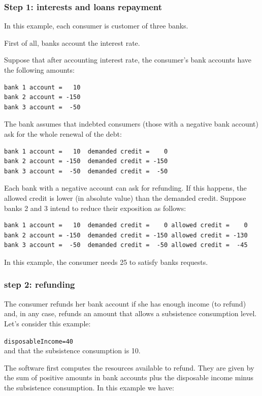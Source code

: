 \documentclass{book}
\begin{document}
\subsubsection*{Step 1: interests and loans repayment}

In this example, each consumer is customer of three banks.

First of all, banks account the interest rate.

Suppose that after accounting interest rate, the consumer's bank accounts have the following amounts:
\begin{verbatim}
bank 1 account =   10
bank 2 account = -150
bank 3 account =  -50
\end{verbatim}

The bank assumes that indebted consumers (those with a negative bank account) ask for the whole renewal of the debt:

\begin{verbatim}
bank 1 account =   10  demanded credit =    0
bank 2 account = -150  demanded credit = -150
bank 3 account =  -50  demanded credit =  -50
\end{verbatim}

Each bank with a negative account can ask for refunding. If this happens, the allowed credit is lower (in absolute value) than the demanded credit.
Suppose banks 2 and 3 intend to reduce their exposition as follows:

\begin{verbatim}
bank 1 account =   10  demanded credit =    0 allowed credit =    0
bank 2 account = -150  demanded credit = -150 allowed credit = -130 
bank 3 account =  -50  demanded credit =  -50 allowed credit =  -45
\end{verbatim}

In this example, the consumer needs 25 to satisfy banks requests.

\subsubsection*{step 2: refunding}
The consumer refunds her bank account if she has enough income (to refund) and, in any case, refunds an amount that allows a subsistence consumption level. 
\\Let's consider this example:

\verb+disposableIncome=40+\\
and that the subsistence consumption is 10.

The software first computes the resources available to refund. They are given by 
the sum of positive amounts in bank accounts plus the disposable income minus the subsistence consumption. In this example we have:
\end{document}
